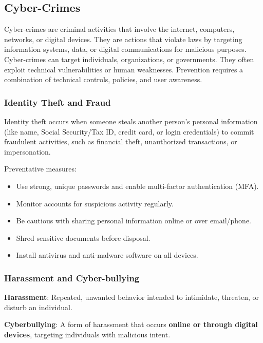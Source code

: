 \subsection{Cyber-Crimes}

\indent 

Cyber-crimes are criminal activities that involve the internet, computers, 
networks, or digital devices. They are actions that violate laws by targeting information systems, data, or digital communications for malicious purposes. Cyber-crimes can target individuals, organizations, or governments. They often exploit technical vulnerabilities or human weaknesses. Prevention requires a combination of technical controls, policies, and user awareness.

\subsubsection{Identity Theft and Fraud}

\indent 

Identity theft occurs when someone steals another person’s personal information (like name, Social Security/Tax ID, credit card, or login credentials) to commit fraudulent activities, such as financial theft, unauthorized transactions, or impersonation.

Preventative measures:

\begin{itemize}
    \item Use strong, unique passwords and enable multi-factor authentication (MFA).
    \item Monitor accounts for suspicious activity regularly.
    \item Be cautious with sharing personal information online or over email/phone.
    \item Shred sensitive documents before disposal.
    \item Install antivirus and anti-malware software on all devices.
\end{itemize}

 \subsubsection{Harassment and Cyber-bullying}

 \indent 

\noindent\textbf{Harassment}: Repeated, unwanted behavior intended to intimidate, threaten, or disturb an individual.

\noindent\textbf{Cyberbullying}: A form of harassment that occurs \textbf{online or through digital devices}, targeting individuals with malicious intent.

